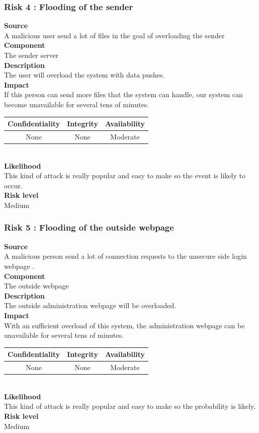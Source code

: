 \documentclass[a4paper,11pt]{article}
\begin{document}
\subsubsection{Risk 4 : Flooding of the sender }
\textbf{Source} \\A malicious user send a lot of files in the goal of overloading the sender\\
\textbf{Component} \\The sender server\\
\textbf{Description}\\ The user will overload the system with data pushes. 
\\
\textbf{Impact}\\
 If this person can send more files that the system can handle, our system can become unavailable for several tens of minutes. \\
\begin{tabular}{|c|c|c|}
\hline
Confidentiality & Integrity & Availability \\
\hline
None & None & Moderate \\
\hline
\end{tabular}\\
\textbf{Likelihood}\\ This kind of attack is really popular and easy to make so the event is likely to occur.\\
\textbf{Risk level}\\Medium\\

\subsubsection{Risk 5 : Flooding of the outside webpage}
\textbf{Source} \\A malicious person send a lot of connection requests to the unsecure side login webpage . \\
\textbf{Component} \\The outside webpage\\
\textbf{Description}\\ The outside administration webpage will be overloaded. \\
\textbf{Impact}\\
With an sufficient overload of this system, the administration webpage can be unavailable for several tens of minutes.\\
\begin{tabular}{|c|c|c|}
\hline
Confidentiality & Integrity & Availability \\
\hline
None & None & Moderate \\
\hline
\end{tabular}\\
\textbf{Likelihood}\\ This kind of attack is really popular and easy to make so the probability is likely.\\
\textbf{Risk level}\\Medium\\
\end{document}
